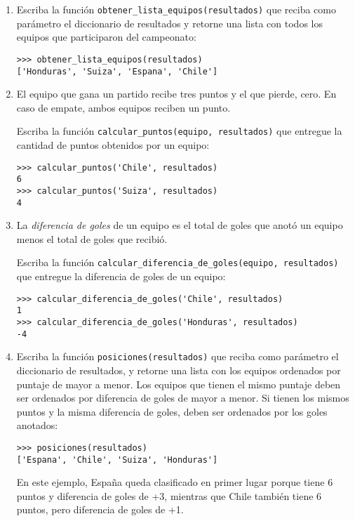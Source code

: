 \begin{enumerate}
\item
  Escriba la función \lstinline!obtener_lista_equipos(resultados)! que
  reciba como parámetro el diccionario de resultados y retorne una lista
  con todos los equipos que participaron del campeonato:

\begin{lstlisting}
>>> obtener_lista_equipos(resultados)
['Honduras', 'Suiza', 'Espana', 'Chile']
\end{lstlisting}
\item
  El equipo que gana un partido recibe tres puntos y el que pierde,
  cero. En caso de empate, ambos equipos reciben un punto.

  Escriba la función \lstinline!calcular_puntos(equipo, resultados)! que
  entregue la cantidad de puntos obtenidos por un equipo:

\begin{lstlisting}
>>> calcular_puntos('Chile', resultados)
6
>>> calcular_puntos('Suiza', resultados)
4
\end{lstlisting}
\item
  La \emph{diferencia de goles} de un equipo es el total de goles que
  anotó un equipo menos el total de goles que recibió.

  Escriba la función
  \lstinline!calcular_diferencia_de_goles(equipo, resultados)! que
  entregue la diferencia de goles de un equipo:

\begin{lstlisting}
>>> calcular_diferencia_de_goles('Chile', resultados)
1
>>> calcular_diferencia_de_goles('Honduras', resultados)
-4
\end{lstlisting}
\item
  Escriba la función \lstinline!posiciones(resultados)! que reciba como
  parámetro el diccionario de resultados, y retorne una lista con los
  equipos ordenados por puntaje de mayor a menor. Los equipos que tienen
  el mismo puntaje deben ser ordenados por diferencia de goles de mayor
  a menor. Si tienen los mismos puntos y la misma diferencia de goles,
  deben ser ordenados por los goles anotados:

\begin{lstlisting}
>>> posiciones(resultados)
['Espana', 'Chile', 'Suiza', 'Honduras']
\end{lstlisting}

  En este ejemplo, España queda clasificado en primer lugar porque tiene
  6 puntos y diferencia de goles de +3, mientras que Chile también tiene
  6 puntos, pero diferencia de goles de +1.
\end{enumerate}
